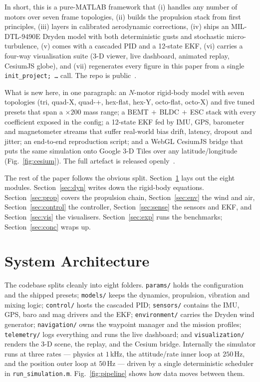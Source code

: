 \documentclass[a4paper, conference]{IEEEtran}
\begin{document}
In short, this is a pure-MATLAB framework that (i) handles any
number of motors over seven frame topologies, (ii) builds the
propulsion stack from first principles, (iii) layers in calibrated
aerodynamic corrections, (iv) ships an MIL-DTL-9490E Dryden model
with both deterministic gusts and stochastic micro-turbulence, (v)
comes with a cascaded PID and a 12-state EKF, (vi) carries a
four-way visualisation suite (3-D viewer, live dashboard, animated
replay, CesiumJS globe), and (vii) regenerates every figure in this
paper from a single \texttt{init\_project; \dots} call. The repo is
public~\cite{repo}.

What is new here, in one paragraph: an $N$-motor rigid-body model
with seven topologies (tri, quad-X, quad-+, hex-flat, hex-Y,
octo-flat, octo-X) and five tuned presets that span a $\times 200$
mass range; a BEMT$\,+\,$BLDC$\,+\,$ESC stack with every coefficient
exposed in the config; a 12-state EKF fed by IMU, GPS, barometer and
magnetometer streams that suffer real-world bias drift, latency,
dropout and jitter; an end-to-end reproduction script; and a WebGL
CesiumJS bridge that puts the same simulation onto Google 3-D Tiles
over any latitude/longitude (Fig.~\ref{fig:cesium}). The full
artefact is released openly~\cite{repo}.

The rest of the paper follows the obvious split. Section~\ref{sec:arch}
lays out the eight modules. Section~\ref{sec:dyn} writes down the
rigid-body equations. Section~\ref{sec:prop} covers the propulsion
chain, Section~\ref{sec:env} the wind and air, Section~\ref{sec:control}
the controller, Section~\ref{sec:sense} the sensors and EKF, and
Section~\ref{sec:vis} the visualisers. Section~\ref{sec:exp} runs the
benchmarks; Section~\ref{sec:conc} wraps up.

\section{System Architecture}\label{sec:arch}
The codebase splits cleanly into eight folders. \texttt{params/}
holds the configuration and the shipped presets;
\texttt{models/} keeps the dynamics, propulsion, vibration and
mixing logic; \texttt{control/} hosts the cascaded PID;
\texttt{sensors/} contains the IMU, GPS, baro and mag drivers and
the EKF; \texttt{environment/} carries the Dryden wind generator;
\texttt{navigation/} owns the waypoint manager and the mission
profiles; \texttt{telemetry/} logs everything and runs the live
dashboard; and \texttt{visualization/} renders the 3-D scene, the
replay, and the Cesium bridge. Internally the simulator runs at
three rates --- physics at $1$\,kHz, the attitude/rate inner loop at
$250$\,Hz, and the position outer loop at $50$\,Hz --- driven by a
single deterministic scheduler in \texttt{run\_simulation.m}.
Fig.~\ref{fig:pipeline} shows how data moves between them.
\end{document}
